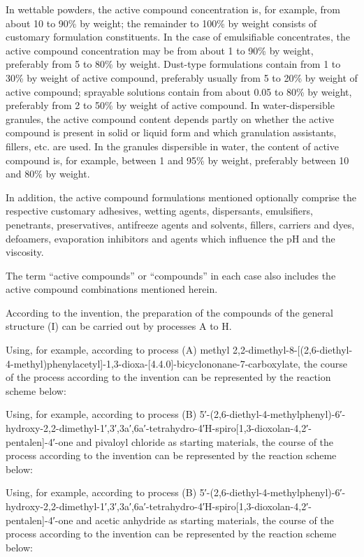 \documentclass[11pt,a4paper]{article}
\begin{document}
In wettable powders, the active compound concentration is, for example, from about 10 to 90\% by weight; the remainder to 100\% by weight consists of customary formulation constituents. In the case of emulsifiable concentrates, the active compound concentration may be from about 1 to 90\% by weight, preferably from 5 to 80\% by weight. Dust-type formulations contain from 1 to 30\% by weight of active compound, preferably usually from 5 to 20\% by weight of active compound; sprayable solutions contain from about 0.05 to 80\% by weight, preferably from 2 to 50\% by weight of active compound. In water-dispersible granules, the active compound content depends partly on whether the active compound is present in solid or liquid form and which granulation assistants, fillers, etc. are used. In the granules dispersible in water, the content of active compound is, for example, between 1 and 95\% by weight, preferably between 10 and 80\% by weight.

In addition, the active compound formulations mentioned optionally comprise the respective customary adhesives, wetting agents, dispersants, emulsifiers, penetrants, preservatives, antifreeze agents and solvents, fillers, carriers and dyes, defoamers, evaporation inhibitors and agents which influence the pH and the viscosity.

The term “active compounds” or “compounds” in each case also includes the active compound combinations mentioned herein.

According to the invention, the preparation of the compounds of the general structure (I) can be carried out by processes A to H.

Using, for example, according to process (A) methyl 2,2-dimethyl-8-[(2,6-diethyl-4-methyl)phenylacetyl]-1,3-dioxa-[4.4.0]-bicyclononane-7-carboxylate, the course of the process according to the invention can be represented by the reaction scheme below:

Using, for example, according to process (B) 5′-(2,6-diethyl-4-methylphenyl)-6′-hydroxy-2,2-dimethyl-1′,3′,3a′,6a′-tetrahydro-4′H-spiro[1,3-dioxolan-4,2′-pentalen]-4′-one and pivaloyl chloride as starting materials, the course of the process according to the invention can be represented by the reaction scheme below:

Using, for example, according to process (B) 5′-(2,6-diethyl-4-methylphenyl)-6′-hydroxy-2,2-dimethyl-1′,3′,3a′,6a′-tetrahydro-4′H-spiro[1,3-dioxolan-4,2′-pentalen]-4′-one and acetic anhydride as starting materials, the course of the process according to the invention can be represented by the reaction scheme below:
\end{document}
